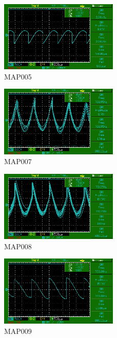 \begin{figure}
    \centering
    \includegraphics[width=0.5\textwidth]{bilder/MAP005.png}
    \caption{MAP005}        
    \label{fig:MAP005}
\end{figure}

\begin{figure}
    \centering
    \includegraphics[width=0.5\textwidth]{bilder/MAP007.png}
    \caption{MAP007}        
    \label{fig:MAP007}
\end{figure}

\begin{figure}
    \centering
    \includegraphics[width=0.5\textwidth]{bilder/MAP008.png}
    \caption{MAP008}        
    \label{fig:MAP008}
\end{figure}

\begin{figure}
    \centering
    \includegraphics[width=0.5\textwidth]{bilder/MAP009.png}
    \caption{MAP009}        
    \label{fig:MAP009}
\end{figure}

